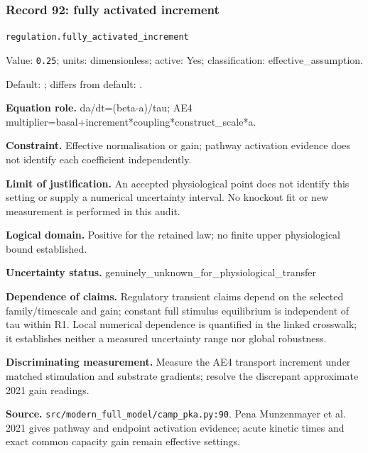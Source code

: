 \subsubsection*{Record 92: fully activated increment}
{\small \nolinkurl{regulation.fully_activated_increment}\par

Value: \texttt{0.25}; units: dimensionless; active: Yes; classification: effective\_assumption.\par

Default: ; differs from default: .\par

\textbf{Equation role.} da/dt=(beta-a)/tau; AE4 multiplier=basal+increment*coupling*construct\_scale*a.\par

\textbf{Constraint.} Effective normalisation or gain; pathway activation evidence does not identify each coefficient independently.\par

\textbf{Limit of justification.} An accepted physiological point does not identify this setting or supply a numerical uncertainty interval. No knockout fit or new measurement is performed in this audit.\par

\textbf{Logical domain.} Positive for the retained law; no finite upper physiological bound established.\par

\textbf{Uncertainty status.} genuinely\_unknown\_for\_physiological\_transfer\par

\textbf{Dependence of claims.} Regulatory transient claims depend on the selected family/timescale and gain; constant full stimulus equilibrium is independent of tau within R1. Local numerical dependence is quantified in the linked crosswalk; it establishes neither a measured uncertainty range nor global robustness.\par

\textbf{Discriminating measurement.} Measure the AE4 transport increment under matched stimulation and substrate gradients; resolve the discrepant approximate 2021 gain readings.\par

\textbf{Source.} \nolinkurl{src/modern_full_model/camp_pka.py:90}. Pena Munzenmayer et al. 2021 gives pathway and endpoint activation evidence; acute kinetic times and exact common capacity gain remain effective settings.\par}

